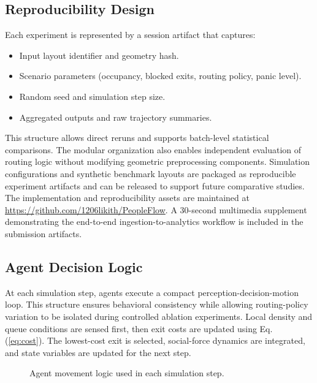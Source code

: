 \documentclass[journal]{IEEEtran}
\begin{document}
\subsection{Reproducibility Design}
Each experiment is represented by a session artifact that captures:
\begin{itemize}
    \item Input layout identifier and geometry hash.
    \item Scenario parameters (occupancy, blocked exits, routing policy, panic level).
    \item Random seed and simulation step size.
    \item Aggregated outputs and raw trajectory summaries.
\end{itemize}
This structure allows direct reruns and supports batch-level statistical comparisons. The modular organization also enables independent evaluation of routing logic without modifying geometric preprocessing components. Simulation configurations and synthetic benchmark layouts are packaged as reproducible experiment artifacts and can be released to support future comparative studies. The implementation and reproducibility assets are maintained at \url{https://github.com/1206likith/PeopleFlow}.
A 30-second multimedia supplement demonstrating the end-to-end ingestion-to-analytics workflow is included in the submission artifacts.

\subsection{Agent Decision Logic}
At each simulation step, agents execute a compact perception-decision-motion loop. This structure ensures behavioral consistency while allowing routing-policy variation to be isolated during controlled ablation experiments. Local density and queue conditions are sensed first, then exit costs are updated using Eq. (\ref{eq:cost}). The lowest-cost exit is selected, social-force dynamics are integrated, and state variables are updated for the next step.

\begin{figure}[t]
\centering
{}
\caption{Agent movement logic used in each simulation step.}
\label{fig:agent_logic}
\end{figure}
\end{document}
